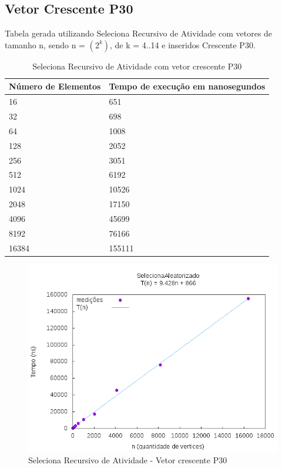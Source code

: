 \documentclass[12pt,a4paper,twoside]{report}
\begin{document}
\subsection{Vetor Crescente P30}
Tabela gerada utilizando Seleciona Recursivo de Atividade com vetores de tamanho n, sendo n = $(2^k)$, de k = 4..14 e inseridos Crescente P30.
\begin{table}[H]
\centering
\caption{Seleciona Recursivo de Atividade com vetor crescente P30}
\label{my-label}
\begin{tabular}{|l|l|}
\hline
\multicolumn{1}{|c|}{\textbf{Número de Elementos}} & \multicolumn{1}{c|}{\textbf{Tempo de execução em nanosegundos}} \\ \hline
16 & 651 \\ \hline
32 & 698 \\ \hline
64 & 1008 \\ \hline
128 & 2052 \\ \hline
256 & 3051 \\ \hline
512 & 6192 \\ \hline
1024 & 10526 \\ \hline
2048 & 17150 \\ \hline
4096 & 45699 \\ \hline
8192 & 76166 \\ \hline
16384 & 155111 \\ \hline
\end{tabular}
\end{table}

\begin{figure}[H]
    \centering
    \includegraphics[width=0.7\linewidth]{graficos/SeletorRecursivoAtividades/Crescente P30/SelecionaAleatorizado.png}
  \caption{Seleciona Recursivo de Atividade - Vetor crescente P30}
\end{figure}
\end{document}
